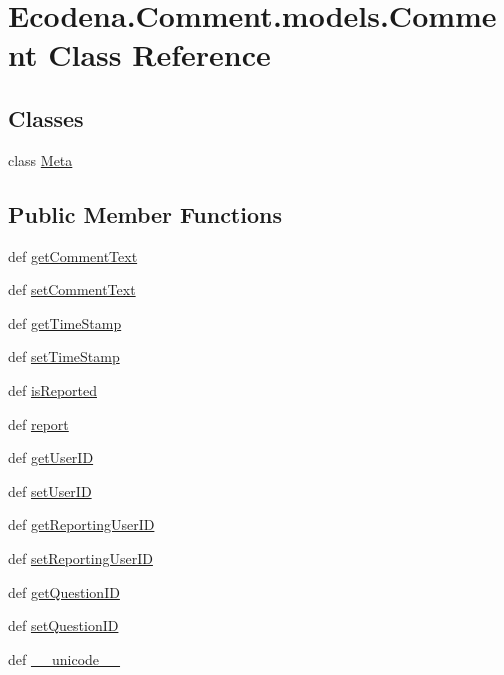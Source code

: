 \hypertarget{class_ecodena_1_1_comment_1_1models_1_1_comment}{
\section{Ecodena.Comment.models.Comment Class Reference}
\label{d9/d86/class_ecodena_1_1_comment_1_1models_1_1_comment}
}
\subsection*{Classes}
\begin{DoxyCompactItemize}
\item 
class \hyperlink{class_ecodena_1_1_comment_1_1models_1_1_comment_1_1_meta}{Meta}
\end{DoxyCompactItemize}
\subsection*{Public Member Functions}
\begin{DoxyCompactItemize}
\item 
def \hyperlink{class_ecodena_1_1_comment_1_1models_1_1_comment_a3f6b4f7b324c721a1b76c67c0ba84d57}{getCommentText}
\item 
def \hyperlink{class_ecodena_1_1_comment_1_1models_1_1_comment_ad969e8c61e75fac5b789cde49aac75f7}{setCommentText}
\item 
def \hyperlink{class_ecodena_1_1_comment_1_1models_1_1_comment_afb7fb603721dc84581c779ed011151bf}{getTimeStamp}
\item 
def \hyperlink{class_ecodena_1_1_comment_1_1models_1_1_comment_a8b7bf3071557abf509e2a6be05551b83}{setTimeStamp}
\item 
def \hyperlink{class_ecodena_1_1_comment_1_1models_1_1_comment_a184ff7b6e67eed6666d71181cea4714b}{isReported}
\item 
def \hyperlink{class_ecodena_1_1_comment_1_1models_1_1_comment_a3b2e83e6f341cd422538bf522ea45cb5}{report}
\item 
def \hyperlink{class_ecodena_1_1_comment_1_1models_1_1_comment_a359153b51a3b3bb2125e546abe716f4f}{getUserID}
\item 
def \hyperlink{class_ecodena_1_1_comment_1_1models_1_1_comment_a75503704563fa3fbc620d090fe59c336}{setUserID}
\item 
def \hyperlink{class_ecodena_1_1_comment_1_1models_1_1_comment_ac0095138a5136a44c576a4a72b0cb27b}{getReportingUserID}
\item 
def \hyperlink{class_ecodena_1_1_comment_1_1models_1_1_comment_ab395cceb4e4a2e94bdce5b3fe2672fee}{setReportingUserID}
\item 
def \hyperlink{class_ecodena_1_1_comment_1_1models_1_1_comment_a3eb84a9f3676cb8e8a5b2710c0a75196}{getQuestionID}
\item 
def \hyperlink{class_ecodena_1_1_comment_1_1models_1_1_comment_ac0085a1c01179bd55023866e4e341750}{setQuestionID}
\item 
def \hyperlink{class_ecodena_1_1_comment_1_1models_1_1_comment_a44ac01108f8a9114e651bb12dd0dc2e3}{\_\-\_\-unicode\_\-\_\-}
\end{DoxyCompactItemize}
